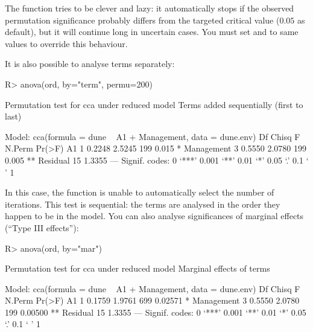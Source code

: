 \documentclass[article,nojss]{jss}
\begin{document}
The  function tries to be clever and lazy: it
automatically stops if the observed permutation significance probably
differs from the targeted critical value ($0.05$ as default), but it
will continue long in uncertain cases.  You must set  and
 to same values to override this behaviour.

It is also possible to analyse terms separately:
\begin{Schunk}
\begin{Sinput}
R> anova(ord, by="term", permu=200)
\end{Sinput}
\begin{Soutput}
Permutation test for cca under reduced model
Terms added sequentially (first to last)

Model: cca(formula = dune ~ A1 + Management, data = dune.env)
           Df  Chisq      F N.Perm Pr(>F)   
A1          1 0.2248 2.5245    199  0.015 * 
Management  3 0.5550 2.0780    199  0.005 **
Residual   15 1.3355                        
---
Signif. codes:  0 ‘***’ 0.001 ‘**’ 0.01 ‘*’ 0.05 ‘.’ 0.1 ‘ ’ 1 
\end{Soutput}
\end{Schunk}
In this case, the function is unable to automatically select the
number of iterations. This test is sequential: the terms are analysed
in the order they happen to be in the model. You can also analyse
significances of marginal effects (``Type III effects''):
\begin{Schunk}
\begin{Sinput}
R> anova(ord, by="mar")
\end{Sinput}
\begin{Soutput}
Permutation test for cca under reduced model
Marginal effects of terms

Model: cca(formula = dune ~ A1 + Management, data = dune.env)
           Df  Chisq      F N.Perm  Pr(>F)   
A1          1 0.1759 1.9761    699 0.02571 * 
Management  3 0.5550 2.0780    199 0.00500 **
Residual   15 1.3355                         
---
Signif. codes:  0 ‘***’ 0.001 ‘**’ 0.01 ‘*’ 0.05 ‘.’ 0.1 ‘ ’ 1 
\end{Soutput}
\end{Schunk}
\end{document}
